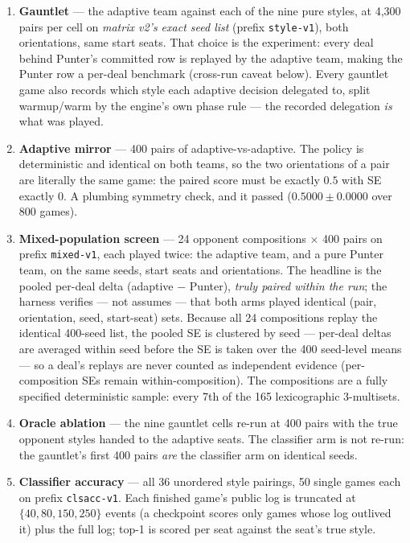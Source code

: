 \documentclass[11pt]{article}
\newcommand{\code}[1]{\texttt{#1}}
\begin{document}
\begin{enumerate}
\item \textbf{Gauntlet} --- the adaptive team against each of the nine pure styles, at
  4{,}300 pairs per cell on \emph{matrix v2's exact seed list} (prefix \code{style-v1}),
  both orientations, same start seats. That choice is the experiment: every deal behind
  Punter's committed row is replayed by the adaptive team, making the Punter row a
  per-deal benchmark (cross-run caveat below). Every gauntlet game also records which
  style each adaptive decision delegated to, split warmup/warm by the engine's own phase
  rule --- the recorded delegation \emph{is} what was played.
\item \textbf{Adaptive mirror} --- 400 pairs of adaptive-vs-adaptive. The policy is
  deterministic and identical on both teams, so the two orientations of a pair are
  literally the same game: the paired score must be exactly $0.5$ with SE exactly $0$. A
  plumbing symmetry check, and it passed ($0.5000 \pm 0.0000$ over 800 games).
\item \textbf{Mixed-population screen} --- 24 opponent compositions $\times$ 400 pairs on
  prefix \code{mixed-v1}, each played twice: the adaptive team, and a pure Punter team, on
  the same seeds, start seats and orientations. The headline is the pooled per-deal delta
  (adaptive $-$ Punter), \emph{truly paired within the run}; the harness verifies --- not
  assumes --- that both arms played identical (pair, orientation, seed, start-seat) sets.
  Because all 24 compositions replay the identical 400-seed list, the pooled SE is
  clustered by seed --- per-deal deltas are averaged within seed before the SE is taken
  over the 400 seed-level means --- so a deal's replays are never counted as independent
  evidence (per-composition SEs remain within-composition). The compositions are a fully
  specified deterministic sample: every 7th of the 165 lexicographic 3-multisets.
\item \textbf{Oracle ablation} --- the nine gauntlet cells re-run at 400 pairs with the
  true opponent styles handed to the adaptive seats. The classifier arm is not re-run: the
  gauntlet's first 400 pairs \emph{are} the classifier arm on identical seeds.
\item \textbf{Classifier accuracy} --- all 36 unordered style pairings, 50 single games
  each on prefix \code{clsacc-v1}. Each finished game's public log is truncated at
  $\{40, 80, 150, 250\}$ events (a checkpoint scores only games whose log outlived it)
  plus the full log; top-1 is scored per seat against the seat's true style.
\end{enumerate}
\end{document}
